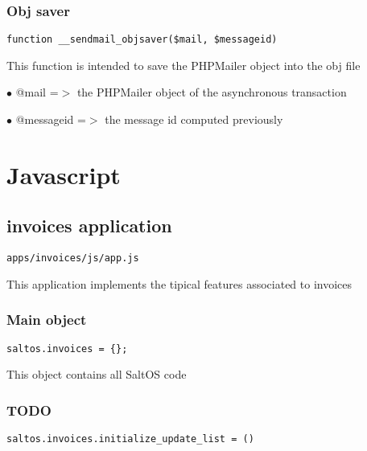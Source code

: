 \documentclass[a4paper]{article}
\begin{document}
\hypertarget{toc71}{}
\subsubsection{Obj saver}

\begin{lstlisting}
function __sendmail_objsaver($mail, $messageid)
\end{lstlisting}

This function is intended to save the PHPMailer object into the obj file

\begin{compactitem}
\item[\color{myblue}$\bullet$] @mail      =$>$ the PHPMailer object of the asynchronous transaction
\item[\color{myblue}$\bullet$] @messageid =$>$ the message id computed previously
\end{compactitem}


\hypertarget{toc72}{}
\section{Javascript}

\hypertarget{toc73}{}
\subsection{invoices application}

\begin{lstlisting}
apps/invoices/js/app.js
\end{lstlisting}

This application implements the tipical features associated to invoices

\hypertarget{toc74}{}
\subsubsection{Main object}

\begin{lstlisting}
saltos.invoices = {};
\end{lstlisting}

This object contains all SaltOS code

\hypertarget{toc75}{}
\subsubsection{TODO}

\begin{lstlisting}
saltos.invoices.initialize_update_list = ()
\end{lstlisting}
\end{document}
